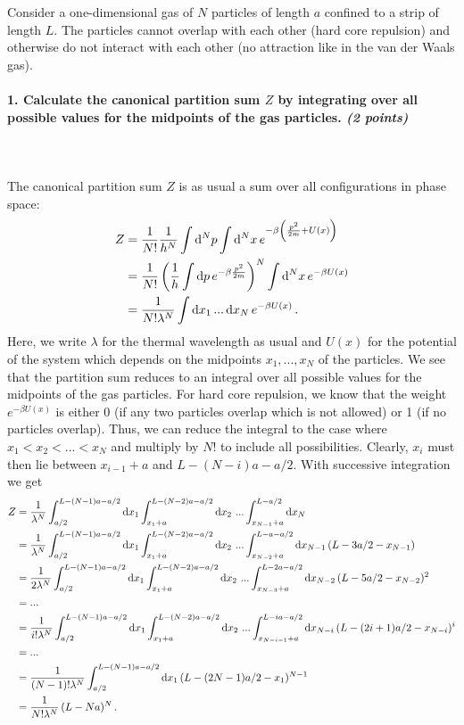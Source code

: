 Consider a one-dimensional gas of $N$ particles of length $a$ confined to a strip of length $L$. The particles
cannot overlap with each other (hard core repulsion) and otherwise do not interact with each other (no
attraction like in the van der Waals gas).

\paragraph{1. Calculate the canonical partition sum $Z$ by integrating over all possible values for the midpoints
of the gas particles. \textit{(2 points)}
} \ \\
\\
The canonical partition sum $Z$ is as usual a sum over all configurations in phase space:
\begin{align}
	Z &= \frac{1}{N!}\frac{1}{h^N} \int\mathrm{d}^Np\int\mathrm{d}^Nx \, e^{-\beta \left( \frac{p^2}{2m} + U(x) \right)} \notag \\
	&= \frac{1}{N!} \left( \frac{1}{h} \int\mathrm{d} p \, e^{-\beta \frac{p^2}{2m}} \right)^N \int\mathrm{d}^Nx \, e^{-\beta U(x)} \notag \\
	&= \frac{1}{N! \lambda^N} \int\mathrm{d} x_1 \, ... \, \mathrm{d} x_N \, e^{-\beta U(x)} \,.
\end{align}
Here, we write $\lambda$ for the thermal wavelength as usual and $U(x)$ for the potential of the system which depends on the midpoints 
$x_1, ..., x_N$ of the particles. We see that the partition sum reduces to an integral over all possible values for the midpoints 
of the gas particles. For hard core repulsion, we know that the weight $e^{-\beta U(x)}$ is either 0 (if any two particles overlap 
which is not allowed) or 1 (if no particles overlap). Thus, we can reduce the integral to the case where $x_1 < x_2 < ... < x_N$ 
and multiply by $N!$ to include all possibilities. Clearly, $x_i$ must then lie between $x_{i-1}+a$ and $L-(N-i)a-a/2$. With 
successive integration we get
\begin{align}
	Z &= \frac{1}{\lambda^N} \int_{a/2}^{L-(N-1)a-a/2}\mathrm{d} x_1  \int_{x_1+a}^{L-(N-2)a-a/2}\mathrm{d} x_2 \, \, ... \int_{x_{N-1}+a}^{L-a/2}\mathrm{d} x_N \notag \\
	&= \frac{1}{\lambda^N} \int_{a/2}^{L-(N-1)a-a/2}\mathrm{d} x_1  \int_{x_1+a}^{L-(N-2)a-a/2}\mathrm{d} x_2 \, \, ... \int_{x_{N-2}+a}^{L-a-a/2}\mathrm{d} x_{N-1} \, (L-3a/2-x_{N-1}) \notag \\
	&= \frac{1}{2\lambda^N} \int_{a/2}^{L-(N-1)a-a/2}\mathrm{d} x_1  \int_{x_1+a}^{L-(N-2)a-a/2}\mathrm{d} x_2 \, \, ... \int_{x_{N-3}+a}^{L-2a-a/2}\mathrm{d} x_{N-2} \, (L-5a/2-x_{N-2})^2 \notag \\
	&= ... \notag \\
	&= \frac{1}{i! \lambda^N} \int_{a/2}^{L-(N-1)a-a/2}\mathrm{d} x_1  \int_{x_1+a}^{L-(N-2)a-a/2}\mathrm{d} x_2 \, \, ... \int_{x_{N-i-1}+a}^{L-ia-a/2}\mathrm{d} x_{N-i} \, (L-(2i+1)a/2-x_{N-i})^i \notag \\
	&= ... \notag \\
	&= \frac{1}{(N-1)! \lambda^N} \int_{a/2}^{L-(N-1)a-a/2}\mathrm{d} x_1 \, (L-(2N-1)a/2-x_1)^{N-1} \notag \\
	&= \frac{1}{N! \lambda^N} \, (L-Na)^N \,.
\end{align}

